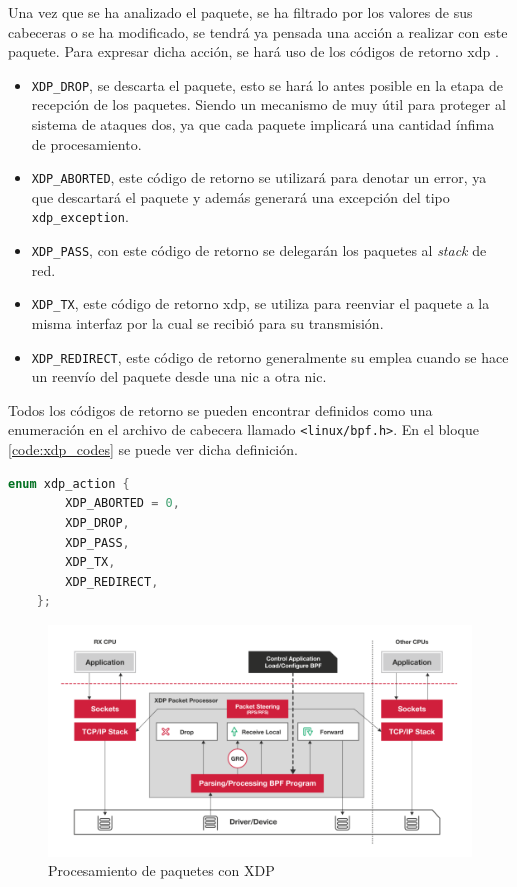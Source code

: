 Una vez que se ha analizado el paquete, se ha filtrado por los valores de sus cabeceras o se ha modificado, se tendrá ya pensada una acción a realizar con este paquete. Para expresar dicha acción, se hará uso de los códigos de retorno \gls{xdp} \cite{xdp2}.
\begin{itemize}
    \item  \texttt{XDP\_DROP}, se descarta el paquete, esto se hará lo antes posible en la etapa de recepción de los paquetes. Siendo un mecanismo de muy útil para proteger al sistema de ataques \gls{dos}, ya que cada paquete implicará una cantidad ínfima de procesamiento.
    \item  \texttt{XDP\_ABORTED}, este código de retorno se utilizará para denotar un error, ya que descartará el paquete y además generará una excepción del tipo \texttt{xdp\_exception}.
    \item  \texttt{XDP\_PASS}, con este código de retorno se delegarán los paquetes al \textit{stack} de red.
    \item  \texttt{XDP\_TX}, este código de retorno \gls{xdp}, se utiliza para reenviar el paquete a la misma interfaz por la cual se recibió para su transmisión.
    \item  \texttt{XDP\_REDIRECT}, este código de retorno generalmente su emplea cuando se hace un reenvío del paquete desde una \gls{nic} a otra \gls{nic}.
\end{itemize}

Todos los códigos de retorno se pueden encontrar definidos como una enumeración en el archivo de cabecera llamado \texttt{<linux/bpf.h>}. En el bloque \ref{code:xdp_codes} se puede ver dicha definición.

\begin{lstlisting}[language=C, style=C-color, caption={Definición de códigos de retorno XDP},label=code:xdp_codes]
    enum xdp_action {
        XDP_ABORTED = 0,
        XDP_DROP,
        XDP_PASS,
        XDP_TX,
        XDP_REDIRECT,
    };
\end{lstlisting}
\vspace{0.2cm}


\begin{figure}[ht]
    \centering
    \includegraphics[width=14.5cm]{archivos/img/teoria/xdp-packet-processing.png}
    \caption{Procesamiento de paquetes con XDP}
    \label{fig:xdp_codes}
\end{figure}

